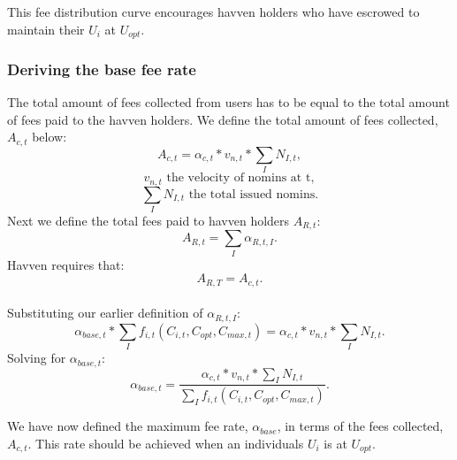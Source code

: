 \begin{center}
\end{center}

\noindent This fee distribution curve encourages havven holders who have escrowed to maintain their $U_i$ at $U_{opt}$.  \\

\newpage

\subsubsection{Deriving the base fee rate}The total amount of fees collected from users has to be equal to the total amount of fees paid to the havven holders. We define the total amount of fees collected, $A_{c,t}$ below: \\
$$ A_{c,t}  = \alpha_{c,t} * v_{n,t} * \sum\limits_I N_{I,t}, $$
$$ v_{n,t} \text{ the velocity of nomins at t}, $$
$$  \sum\limits_I N_{I,t} \text{ the total issued nomins}. $$
Next we define the total fees paid to havven holders $A_{R,t}$: \\
$$ A_{R,t} = \sum\limits_I \alpha_{R,t,I}. $$
Havven requires that: \\
$$ A_{R,T} =  A_{c,t}. $$ \\
Substituting our earlier definition of $\alpha_{R,t,I}$: \\
$$ \alpha_{base,t} *\sum\limits_I f_{i,t}(C_{i,t}, C_{opt}, C_{max,t}) =  \alpha_{c,t} * v_{n,t} * \sum\limits_I N_{I,t}. $$
Solving for $\alpha_{base,t}$:\\
$$ \alpha_{base,t} = \frac{\alpha_{c,t} * v_{n,t} * \sum\limits_I N_{I,t}}{\sum\limits_I f_{i,t}(C_{i,t}, C_{opt}, C_{max,t})}.$$

\noindent We have now defined the maximum fee rate, $\alpha_{base}$, in terms of the fees collected, $A_{c,t}$. This rate should be achieved when an individuals $U_i$ is at $U_{opt}$. \\

